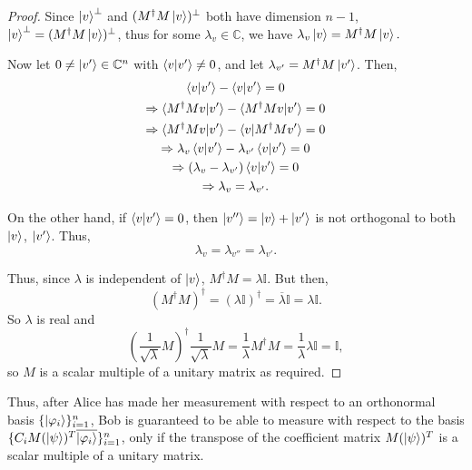 \begin{proof}
\noindent
Since $\ket{v}^\perp$ and $(M^\dagger M\ket{v})^\perp$ both have dimension $n-1$, $\ket{v}^\perp = (M^\dagger M\ket{v})^\perp$, thus for some $\lambda_v \in \mathbb{C}$, we have $\lambda_v \ket{v} = M^\dagger M \ket{v}.$

Now let $0 \neq \ket{v'} \in \mathbb{C}^n$ with $\braket{v|v'} \neq 0$, and let ${\lambda}_{v'}=M^\dagger M \ket{v'}$.  Then,
\begin{gather*}
\braket{v|v'}-\braket{v|v'}=0\\
\Rightarrow \braket{M^\dagger M v|v'}-\braket{M^\dagger M v|v'}=0\\
\Rightarrow \braket{M^\dagger M v|v'}-\braket{v|M^\dagger M v'}=0\\
\Rightarrow \lambda_v \braket{v|v'}-\lambda_{v'} \braket{v|v'}=0\\
\Rightarrow (\lambda_v -\lambda_{v'}) \braket{v|v'}=0\\
\Rightarrow  \lambda_v = \lambda_{v'}.
\end{gather*}

On the other hand, if $\braket{v|v'}=0$, then $ \ket{v''}=\ket{v}+\ket{v'}$ is not orthogonal to both $\ket{v}$, $\ket{v'}$.  Thus, 
$$ {\lambda}_{v}=\lambda_{v''}=\lambda_{v'}.$$

Thus, since $\lambda$ is independent of $\ket{v}$, $M^\dagger M = \lambda \mathbb{I}$.  But then,
\begin{equation*}
{(M^\dagger M)}^\dagger={(\lambda \mathbb{I})}^\dagger=\overline{\lambda} \mathbb{I} =\lambda \mathbb{I}.
\end{equation*}
So $\lambda$ is real and  
\begin{equation*}
{(\frac{1}{\sqrt{\lambda}}M)}^\dagger \frac{1}{\sqrt{\lambda}}M=\frac{1}{\lambda}M^\dagger M=\frac{1}{\lambda}\lambda\mathbb{I}=\mathbb{I},
\end{equation*}
so $M$ is a scalar multiple of a unitary matrix as required.
\end{proof}



Thus, after Alice has made her measurement with respect to an orthonormal basis $\{\ket{\varphi_i}\}_{i=1}^n$, Bob is guaranteed to be able to measure with respect to the basis $\{C_iM(\ket{\psi})^T {\overline{\ket{\varphi_i}}}\}_{i=1}^n$, only if the transpose of the coefficient matrix $M(\ket{\psi})^T$ is a scalar multiple of a unitary matrix. 

